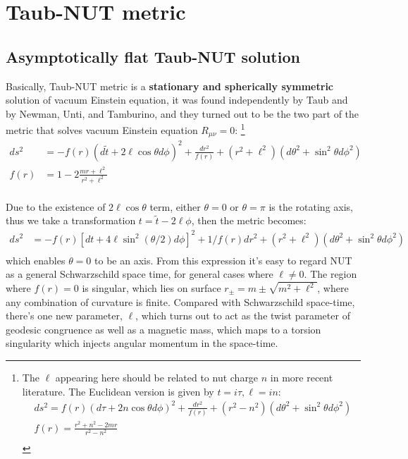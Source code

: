 \documentclass[12pt, a4paper]{article}
\numberwithin{equation}{section}
\newcommand{\be}{\begin{equation}}
\newcommand{\ee}{\end{equation}}
\begin{document}
	
{\flushright{\today}}
\tableofcontents


\section{Taub-NUT metric}
\subsection{Asymptotically flat Taub-NUT solution}


Basically, Taub-NUT metric is a \textbf{stationary and spherically symmetric} solution of vacuum Einstein equation, it was found independently by Taub\cite{Taub:1951gm} and by Newman, Unti, and Tamburino\cite{Newman:1963sm}, and they turned out to be the two part of the metric\cite{Misner:1965aa} that solves vacuum Einstein equation $R_{\mu\nu}=0$:\cite{Misner:1963ss}\cite{Newman:1963sm}\cite{Taub:1951gm}
\footnote{The $\ell$ appearing here should be related to nut charge $n$ in more recent literature. The Euclidean version is given by $t = i\tau, \ell = in$:
	\be
	\begin{aligned}
		&ds^2 = f(r)(d\tau+2n\cos\theta d\phi)^2 + \frac{dr^2}{f(r)} + (r^2 - n^2)(d\theta^2 +\sin^2\theta d\phi^2)&\\
		&f(r) = \frac{r^2 + n^2 -2m r}{r^2 - n^2}&\\
	\end{aligned}
	\ee}
\be
\begin{aligned}
	ds^2 &= -f(r)(d\tilde{t} + 2\ell \cos\theta d\phi)^2+\frac{dr^2}{f(r)} + (r^2+\ell^2)(d\theta^2 + \sin^2\theta d\phi^2)&\\
	f(r) &=  1 - 2\frac{mr+\ell^2}{r^2+\ell^2}&\\
\end{aligned}
\ee

Due to the existence of $2\ell \cos\theta$ term, either $\theta = 0$ or $\theta = \pi$ is the rotating axis, thus we take a transformation $t = \tilde{t} - 2\ell \phi$, then the metric becomes:\cite{Griffiths:2009gr}
\be
\begin{aligned}
	ds^2 &= -f(r)[dt+4\ell\sin^2(\theta/2) d\phi]^2 + 1/f(r) dr^2 + (r^2+\ell^2)(d\theta^2 + \sin^2\theta d\phi^2)&\\
	\label{TNaxis}
\end{aligned}
\ee%
which enables $\theta = 0$ to be an axis. From this expression it's easy to regard NUT as a general Schwarzschild space time, for general cases where $\ell \ne 0$. The region where $f(r) = 0$ is singular, which lies on surface $r_\pm = m \pm \sqrt{m^2 + \ell^2}$, where any combination of curvature is finite. Compared with Schwarzschild space-time, there's one new parameter, $\ell$, which turns out to act as the twist parameter of geodesic congruence as well as a magnetic mass, which maps to a torsion singularity which injects angular momentum in the space-time.\cite{Griffiths:2009gr}
\end{document}
